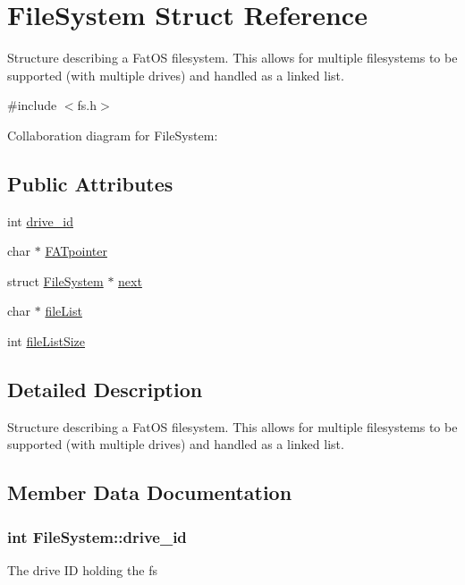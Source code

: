 \hypertarget{structFileSystem}{}\section{File\+System Struct Reference}
\label{structFileSystem}


Structure describing a Fat\+OS filesystem. This allows for multiple filesystems to be supported (with multiple drives) and handled as a linked list.  




{\ttfamily \#include $<$fs.\+h$>$}



Collaboration diagram for File\+System\+:
\subsection*{Public Attributes}
\begin{DoxyCompactItemize}
\item 
int \hyperlink{structFileSystem_adf2ca4f011508f880c0095651eca233d}{drive\+\_\+id}
\item 
char $\ast$ \hyperlink{structFileSystem_a3e1cf4a9014004a11da7c33dab43e5a5}{F\+A\+Tpointer}
\item 
struct \hyperlink{structFileSystem}{File\+System} $\ast$ \hyperlink{structFileSystem_ab4ddc9a8bdbe8207f08d140629eb8e42}{next}
\item 
char $\ast$ \hyperlink{structFileSystem_a5557603bd4758e4f1c723931beab9870}{file\+List}
\item 
int \hyperlink{structFileSystem_a2317b8632ea9ed2aeebb92bb2c085a13}{file\+List\+Size}
\end{DoxyCompactItemize}


\subsection{Detailed Description}
Structure describing a Fat\+OS filesystem. This allows for multiple filesystems to be supported (with multiple drives) and handled as a linked list. 

\subsection{Member Data Documentation}
\subsubsection[{\texorpdfstring{drive\+\_\+id}{drive_id}}]{\setlength{\rightskip}{0pt plus 5cm}int File\+System\+::drive\+\_\+id}\hypertarget{structFileSystem_adf2ca4f011508f880c0095651eca233d}{}\label{structFileSystem_adf2ca4f011508f880c0095651eca233d}
The drive ID holding the fs 
